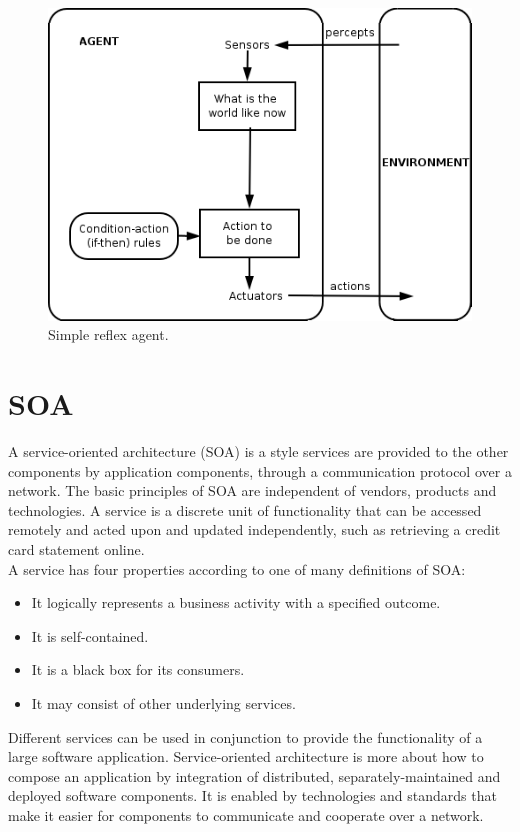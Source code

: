 \documentclass{article}
\begin{document}
\begin{figure}[h]
\centering
\includegraphics[scale=0.7]{mas.png}
\caption{Simple reflex agent.}
\label{fig_mas}
\end{figure}

\newpage	


\section{SOA}
A service-oriented architecture (SOA) is a style services are provided to the other components by application components, through a communication protocol over a network. The basic principles of SOA are independent of vendors, products and technologies. A service is a discrete unit of functionality that can be accessed remotely and acted upon and updated independently, such as retrieving a credit card statement online.\\

\noindent A service has four properties according to one of many definitions of SOA:
\begin{itemize}

\item It logically represents a business activity with a specified outcome.
\item It is self-contained.
\item It is a black box for its consumers.
\item It may consist of other underlying services.\\

\end{itemize}
Different services can be used in conjunction to provide the functionality of a large software application. Service-oriented architecture is more about how to compose an application by integration of distributed, separately-maintained and deployed software components. It is enabled by technologies and standards that make it easier for components to communicate and cooperate over a network.\\\\
\end{document}
